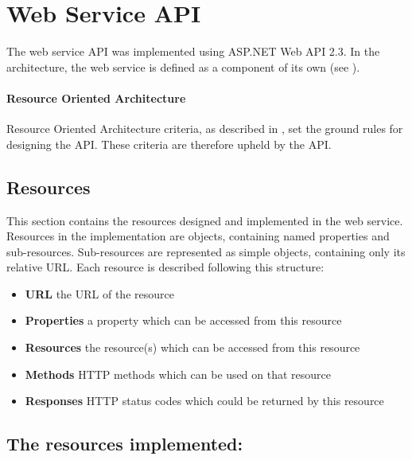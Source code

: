 \section{Web Service API}\label{design:web_service}
The web service API was implemented using ASP.NET Web API 2.3\cite{aspnet_webapi}.
In the architecture, the web service is defined as a component of its own (see ).

\paragraph{Resource Oriented Architecture}
Resource Oriented Architecture criteria, as described in , set the ground rules for designing the API.
These criteria are therefore upheld by the API.

\subsection{Resources}\label{webservice:resources}
This section contains the resources designed and implemented in the web service.
Resources in the implementation are objects, containing named properties and sub-resources.
Sub-resources are represented as simple objects, containing only its relative URL.
Each resource is described following this structure:
\begin{itemize}
\item \textbf{URL} the URL of the resource
\item \textbf{Properties} a property which can be accessed from this resource
\item \textbf{Resources} the resource(s) which can be accessed from this resource
\item \textbf{Methods} HTTP methods which can be used on that resource
\item \textbf{Responses} HTTP status codes which could be returned by this resource
\end{itemize}

\subsection{The resources implemented:}
\newcommand{\resource}[6]{\noindent \vfill \fbox{\begin{minipage}{\textwidth}\begin{description}
\item[URL:]{\texttt{#1}}
\item[Properties:]{\texttt{#2}}
\item[Resources:]{\texttt{#3}}
\item[Methods:]{\texttt{#4}}
\item[Responses:]{\texttt{#5}}
\end{description}
{#6}
\end{minipage}
}\vfill }

